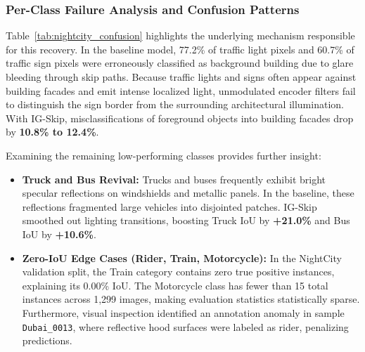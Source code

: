 \documentclass[conference]{IEEEtran}
\begin{document}
\begin{table}[t]
\caption{Reduction in Misclassifications into Background `Building' on NightCity.}
\label{tab:nightcity_confusion}
\centering
{}
\end{table}

\subsubsection{Per-Class Failure Analysis and Confusion Patterns}
Table~\ref{tab:nightcity_confusion} highlights the underlying mechanism responsible for this recovery. In the baseline model, 77.2\% of traffic light pixels and 60.7\% of traffic sign pixels were erroneously classified as background building due to glare bleeding through skip paths. Because traffic lights and signs often appear against building facades and emit intense localized light, unmodulated encoder filters fail to distinguish the sign border from the surrounding architectural illumination. With IG-Skip, misclassifications of foreground objects into building facades drop by \textbf{10.8\% to 12.4\%}.

Examining the remaining low-performing classes provides further insight:
\begin{itemize}
    \item \textbf{Truck and Bus Revival:} Trucks and buses frequently exhibit bright specular reflections on windshields and metallic panels. In the baseline, these reflections fragmented large vehicles into disjointed patches. IG-Skip smoothed out lighting transitions, boosting Truck IoU by \textbf{+21.0\%} and Bus IoU by \textbf{+10.6\%}.
    \item \textbf{Zero-IoU Edge Cases (Rider, Train, Motorcycle):} In the NightCity validation split, the Train category contains zero true positive instances, explaining its 0.00\% IoU. The Motorcycle class has fewer than 15 total instances across 1,299 images, making evaluation statistics statistically sparse. Furthermore, visual inspection identified an annotation anomaly in sample \texttt{Dubai\_0013}, where reflective hood surfaces were labeled as rider, penalizing predictions.
\end{itemize}
\end{document}
